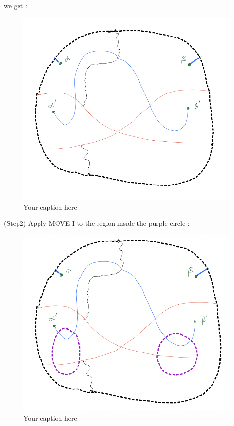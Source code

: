 we get :

\begin{figure}[H] %
    \centering
    \includegraphics[width=\linewidth]{diagrams/definition10/3.png} %
    \caption{Your caption here}
    \label{fig:your-label}
\end{figure}

(Step2) Apply MOVE \RN{1} to the region inside the purple circle :

\begin{figure}[H] %
    \centering
    \includegraphics[width=\linewidth]{diagrams/definition10/4.png} %
    \caption{Your caption here}
    \label{fig:your-label}
\end{figure}

